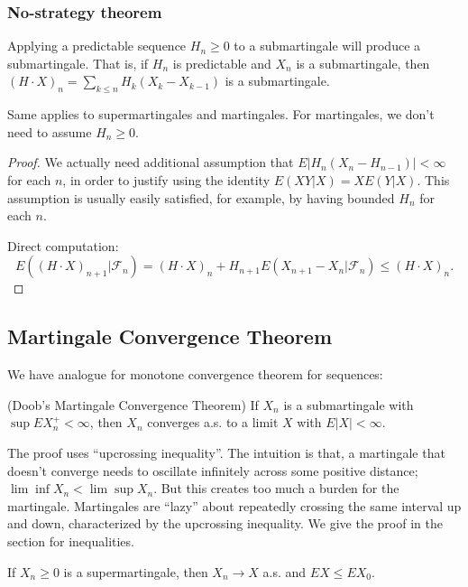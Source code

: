 \subsubsection{No-strategy theorem}

\begin{theorem}
	Applying a predictable sequence $H_n \ge 0$ to a submartingale will produce a submartingale. That is, if $H_n$ is predictable and $X_n$ is a submartingale, then $(H\cdot X)_n = \sum_{k \le n}H_k (X_k - X_{k-1})$ is a submartingale.
\end{theorem}
Same applies to supermartingales and martingales. For martingales, we don't need to assume $H_n \ge 0$.
\begin{proof}
	We actually need additional assumption that $E\left| H_n (X_n - H_{n-1}) \right| < \infty $ for each $n$, in order to justify using the identity $E\left( XY | X \right) = X E(Y|X)$. This assumption is usually easily satisfied, for example, by having bounded $H_n$ for each $n$.

	Direct computation:
	\[
		E\left( (H \cdot X)_{n+1} | \mathcal{F}_n \right) 
		= (H \cdot X)_n + H_{n+1} E\left( X_{n+1} - X_n | \mathcal{F}_n \right) 
		\le (H \cdot X)_n
	.\] 
\end{proof}






\subsection{Martingale Convergence Theorem}

We have analogue for monotone convergence theorem for sequences:

\begin{theorem}
	(Doob's Martingale Convergence Theorem)
	\label{thm:DoobMartingaleConvergence}
	If $X_n$ is a submartingale with $\sup EX_n^+ < \infty $, then $X_n$ converges a.s. to a limit $X$ with $E|X| < \infty $.
\end{theorem}
The proof uses ``upcrossing inequality''. The intuition is that, a martingale that doesn't converge needs to oscillate infinitely across some positive distance; $\lim\inf X_n < \lim\sup X_n$. But this creates too much a burden for the martingale. Martingales are ``lazy'' about repeatedly crossing the same interval up and down, characterized by the upcrossing inequality.
We give the proof in the section for inequalities.

\begin{corollary}
	If $X_n \ge 0$ is a supermartingale, then $X_n \to  X$ a.s. and $EX \le  E X_0$.
\end{corollary}




